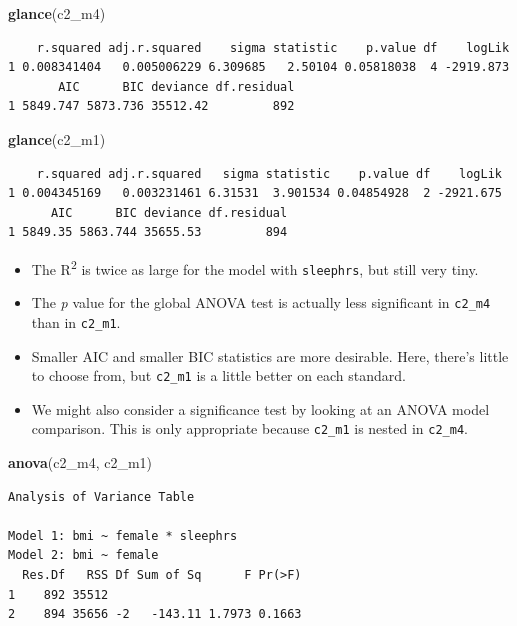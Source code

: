 \documentclass[]{book}
\newenvironment{Shaded}{\begin{snugshade}}{\end{snugshade}}
\newcommand{\KeywordTok}[1]{\textcolor[rgb]{0.13,0.29,0.53}{\textbf{#1}}}
\newcommand{\NormalTok}[1]{#1}
\providecommand{\tightlist}{%
  \setlength{\itemsep}{0pt}\setlength{\parskip}{0pt}}
\theoremstyle{definition}
\theoremstyle{definition}
\theoremstyle{definition}
\theoremstyle{remark}
\begin{document}
\begin{Shaded}
\begin{Highlighting}[]
\KeywordTok{glance}\NormalTok{(c2_m4)}
\end{Highlighting}
\end{Shaded}

\begin{verbatim}
    r.squared adj.r.squared    sigma statistic    p.value df    logLik
1 0.008341404   0.005006229 6.309685   2.50104 0.05818038  4 -2919.873
       AIC      BIC deviance df.residual
1 5849.747 5873.736 35512.42         892
\end{verbatim}

\begin{Shaded}
\begin{Highlighting}[]
\KeywordTok{glance}\NormalTok{(c2_m1)}
\end{Highlighting}
\end{Shaded}

\begin{verbatim}
    r.squared adj.r.squared   sigma statistic    p.value df    logLik
1 0.004345169   0.003231461 6.31531  3.901534 0.04854928  2 -2921.675
      AIC      BIC deviance df.residual
1 5849.35 5863.744 35655.53         894
\end{verbatim}

\begin{itemize}
\tightlist
\item
  The R\textsuperscript{2} is twice as large for the model with
  \texttt{sleephrs}, but still very tiny.
\item
  The \emph{p} value for the global ANOVA test is actually less
  significant in \texttt{c2\_m4} than in \texttt{c2\_m1}.
\item
  Smaller AIC and smaller BIC statistics are more desirable. Here,
  there's little to choose from, but \texttt{c2\_m1} is a little better
  on each standard.
\item
  We might also consider a significance test by looking at an ANOVA
  model comparison. This is only appropriate because \texttt{c2\_m1} is
  nested in \texttt{c2\_m4}.
\end{itemize}

\begin{Shaded}
\begin{Highlighting}[]
\KeywordTok{anova}\NormalTok{(c2_m4, c2_m1)}
\end{Highlighting}
\end{Shaded}

\begin{verbatim}
Analysis of Variance Table

Model 1: bmi ~ female * sleephrs
Model 2: bmi ~ female
  Res.Df   RSS Df Sum of Sq      F Pr(>F)
1    892 35512                           
2    894 35656 -2   -143.11 1.7973 0.1663
\end{verbatim}
\end{document}
